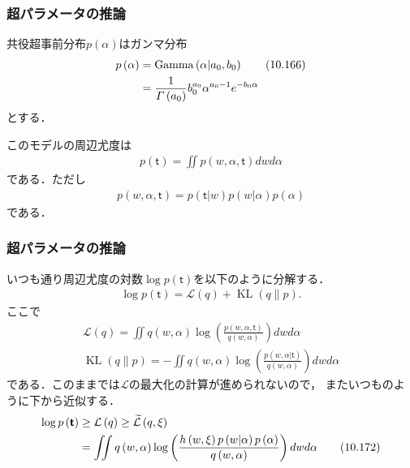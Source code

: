 \documentclass[10pt,hyperref={unicode}]{beamer}
\DeclareMathOperator*{\KL}{KL}
\DeclareMathOperator*{\GammaDistribution}{Gamma}
\newcommand{\parentheses}[1]{\left(#1\right)}
\newcommand{\energy}{\mathcal{L}}
\begin{document}
\begin{frame}
\frametitle{超パラメータの推論}
共役超事前分布$p\parentheses{\alpha}$はガンマ分布
\begin{align}
    p\parentheses{\alpha}
    &= \GammaDistribution\parentheses{\alpha|a_0,b_0} \tag{10.166} \label{palpha} \\
    &= \frac{1}{\varGamma\parentheses{a_0}}b_0^{a_0}\alpha^{a_0 - 1}e^{-b_0\alpha} \notag
\end{align}
とする．

\bigskip

このモデルの周辺尤度は
\begin{align}
    p\parentheses{\bm{\mathsf{t}}} = \iint p\parentheses{w,\alpha,\bm{\mathsf{t}}}dwd\alpha \tag{10.167}
\end{align}
である．ただし
\begin{align}
    p\parentheses{w,\alpha,\bm{\mathsf{t}}} = p\parentheses{\bm{\mathsf{t}}|w}p\parentheses{w|\alpha}p\parentheses{\alpha} \tag{10.168}
\end{align}
である．
\end{frame}

\begin{frame}
\frametitle{超パラメータの推論}
いつも通り周辺尤度の対数$\log p\parentheses{\bm{\mathsf{t}}}$を以下のように分解する．
\begin{align*}
    \log p\parentheses{\bm{\mathsf{t}}} = \energy\parentheses{q} + \KL\parentheses{q\|p}. \tag{10.169}
\end{align*}
ここで
\begin{gather}
    \energy\parentheses{q}
    = \iint q\parentheses{w,\alpha}
    \log\parentheses{%
        \frac{p\parentheses{w,\alpha,\bm{\mathsf{t}}}}{q\parentheses{w,\alpha}}
    }
    dwd\alpha \tag{10.170} \\
    \KL\parentheses{q\|p}
    = -\iint q\parentheses{w,\alpha}
    \log\parentheses{%
        \frac{p\parentheses{w,\alpha|\bm{\mathsf{t}}}}{q\parentheses{w,\alpha}}
    }
    dwd\alpha \tag{10.171}
\end{gather}
である．このままでは$\energy$の最大化の計算が進められないので，
またいつものように下から近似する．
\begin{align}
    \log p\parentheses{\bm{\mathsf{t}}}
    &\geq \energy\parentheses{q} \geq \widetilde{\energy}\parentheses{q,\xi} \notag \\
    &= \iint q\parentheses{w,\alpha}\log\parentheses{\frac{h\parentheses{w,\xi}p\parentheses{w|\alpha}p\parentheses{\alpha}}{q\parentheses{w,\alpha}}}dwd\alpha
    \tag{10.172}
\end{align}
\end{frame}
\end{document}
